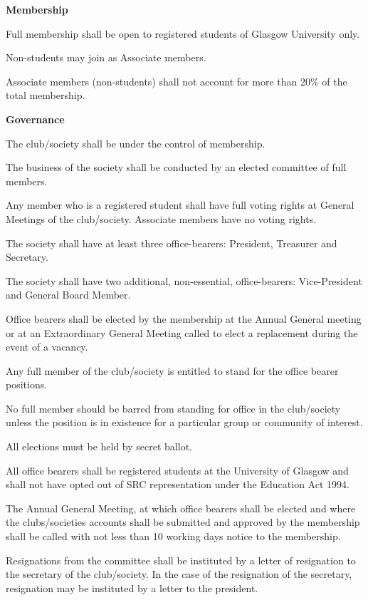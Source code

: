 \documentclass[11pt]{article}
\newcommand{\headItem}[1]{\global\isHeadtrue\item {\bfseries #1}}
\newif\ifisHead
\begin{document}
\begin{level}
\begin{level}
		\end{level}

		\headItem {Membership}
		\begin{level}
			\item Full membership shall be open to registered students of Glasgow University only.
			\item Non-students may join as Associate members.
			\item Associate members (non-students) shall not account for more than 20\% of the total membership.
			
		\end{level}
	
		\headItem {Governance}
		\begin{level}
			\item The club/society shall be under the control of membership.
			\item The business of the society shall be conducted by an elected committee of full members.
			\item Any member who is a registered student shall have full voting rights at General Meetings of the club/society. Associate members have no voting rights.
			\item The society shall have at least three office-bearers: President, Treasurer and Secretary. 
			\item The society shall have two additional, non-essential, office-bearers: Vice-President and General Board Member.
			\item Office bearers shall be elected by the membership at the Annual General meeting or at an Extraordinary General Meeting called to elect a replacement during the event of a vacancy.
			\item Any full member of the club/society is entitled to stand for the office bearer positions.
			\item No full member should be barred from standing for office in the club/society unless the position is in existence for a particular group or community of interest.
			\item All elections must be held by secret ballot.
			\item All office bearers shall be registered students at the University of Glasgow and shall not have opted out of SRC representation under the Education Act 1994.
			\item The Annual General Meeting, at which office bearers shall be elected and where the clubs/societies accounts shall be submitted and approved by the membership shall be called with not less than 10 working days notice to the membership.
			\item Resignations from the committee shall be instituted by a letter of resignation to the secretary of the club/society. In the case of the resignation of the secretary, resignation may be instituted by a letter to the president.
			

\end{level}
\end{level}
\end{document}
